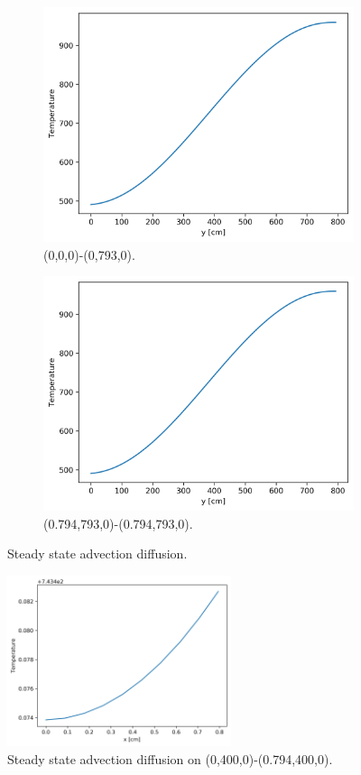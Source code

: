 \documentclass[11pt,letterpaper]{article}
\begin{document}
	\begin{figure}[htbp!]
		\centering
		\begin{subfigure}[t]{0.4\textwidth}
			\centering
			\includegraphics[width=\linewidth]{cg-advec2-ssA}
			\caption{(0,0,0)-(0,793,0).}
		\end{subfigure}
		\begin{subfigure}[t]{0.4\textwidth}
			\centering
	        \includegraphics[width=\linewidth]{cg-advec2-ssB}
			\caption{(0.794,793,0)-(0.794,793,0).}
		\end{subfigure}
		\hfill
		\caption{Steady state advection diffusion.}
		\label{fig:cg-advec2-ssA}
	\end{figure}

	\begin{figure}[htbp!]
		\centering
		\includegraphics[height=5cm]{cg-advec2-ssC}
		\caption{Steady state advection diffusion on (0,400,0)-(0.794,400,0).}
		\label{fig:cg-advec2-ssB}
	\end{figure}

\pagebreak

% 
\end{document}
